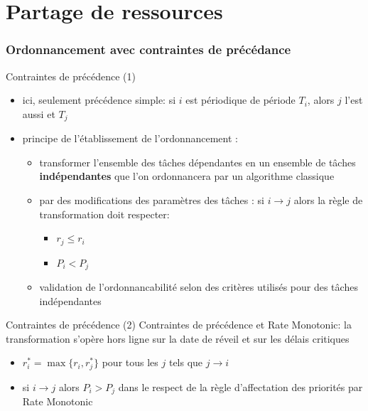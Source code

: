 %                                                                                                               
%
%

\part{Partage de ressources}

\section{Ordonnancement avec contraintes de précédance}

\begin{frame}{Contraintes de précédence (1)} 
  \begin{itemize}
  \item ici,  seulement précédence simple: si $i$  est périodique de
    période $T_i$, alors $j$ l'est aussi et $T_j$
  \item principe de l'établissement de l'ordonnancement :
    \begin{itemize} 
    \item transformer l'ensemble des tâches dépendantes en un ensemble
      de  tâches \textbf{indépendantes} que  l'on ordonnancera  par un
      algorithme classique
    \item par des modifications des  paramètres des tâches : si $i →
      j$ alors la règle de transformation doit respecter:
      \begin{itemize} 
      \item $r_j ≤ r_i$
      \item $P_i < P_j$
      \end{itemize} 
    \item  validation  de   l'ordonnancabilité  selon  des  critères
      utilisés pour des tâches indépendantes
    \end{itemize}
  \end{itemize}
\end{frame}

\begin{frame}{Contraintes de précédence (2)} 
  Contraintes  de  précédence  et  Rate Monotonic:  la  transformation
  s'opère hors ligne sur la date de réveil et sur les délais critiques
  \begin{itemize} 
  \item $r^*_i = \max\{r_i, r^*_j\}$ pour tous les $j$ tels que $j →
    i$
  \item si $i  → j$ alors $P_i > P_j$ dans  le respect de la
    règle d'affectation des priorités par Rate Monotonic
  \end{itemize}
\end{frame} 

